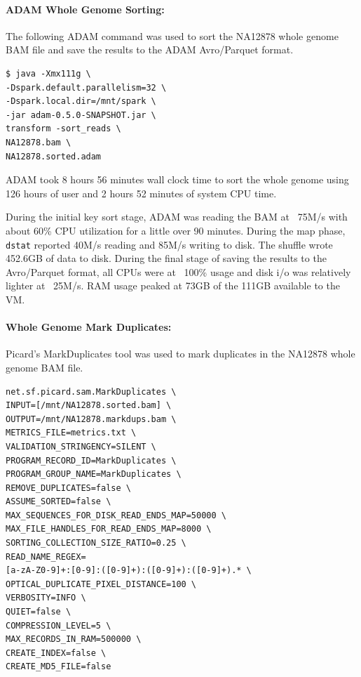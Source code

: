 \documentclass[10pt,twocolumn]{article}
\theoremstyle{plain}
\begin{document}
\paragraph{ADAM Whole Genome Sorting:}
\label{sec:single-sort-adam}

The following ADAM command was used to sort the NA12878 whole genome BAM file and save the results to the 
ADAM Avro/Parquet format.

\begin{lstlisting}
$ java -Xmx111g \
-Dspark.default.parallelism=32 \
-Dspark.local.dir=/mnt/spark \
-jar adam-0.5.0-SNAPSHOT.jar \
transform -sort_reads \
NA12878.bam \
NA12878.sorted.adam
\end{lstlisting}

ADAM took 8 hours 56 minutes wall clock time to sort the whole genome using 126 hours of user and 2 hours 52 minutes of 
system CPU time. 

During the initial key sort stage, ADAM was reading the BAM at ~75M/s with about 60\% CPU utilization for a little over
90 minutes. During the map phase, \texttt{dstat} reported 40M/s reading and 85M/s writing to disk. The shuffle wrote
452.6GB of data to disk. During the final stage of saving the results to the Avro/Parquet format, all CPUs were at
~100\% usage and disk i/o was relatively lighter at ~25M/s. RAM usage peaked at 73GB of the 111GB available to the VM.

\paragraph{Whole Genome Mark Duplicates:}
\label{sec:single-node-whole-genome}

Picard's MarkDuplicates tool was used to mark duplicates in the NA12878 whole genome BAM file.

\begin{lstlisting}
net.sf.picard.sam.MarkDuplicates \
INPUT=[/mnt/NA12878.sorted.bam] \
OUTPUT=/mnt/NA12878.markdups.bam \
METRICS_FILE=metrics.txt \
VALIDATION_STRINGENCY=SILENT \
PROGRAM_RECORD_ID=MarkDuplicates \
PROGRAM_GROUP_NAME=MarkDuplicates \
REMOVE_DUPLICATES=false \
ASSUME_SORTED=false \
MAX_SEQUENCES_FOR_DISK_READ_ENDS_MAP=50000 \
MAX_FILE_HANDLES_FOR_READ_ENDS_MAP=8000 \
SORTING_COLLECTION_SIZE_RATIO=0.25 \
READ_NAME_REGEX=
[a-zA-Z0-9]+:[0-9]:([0-9]+):([0-9]+):([0-9]+).* \
OPTICAL_DUPLICATE_PIXEL_DISTANCE=100 \
VERBOSITY=INFO \
QUIET=false \
COMPRESSION_LEVEL=5 \
MAX_RECORDS_IN_RAM=500000 \
CREATE_INDEX=false \
CREATE_MD5_FILE=false
\end{lstlisting}
\end{document}
